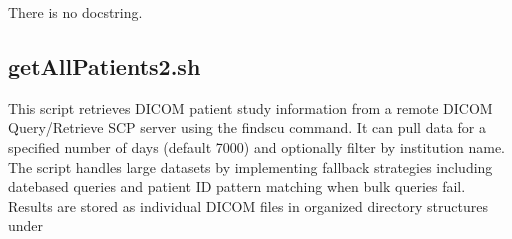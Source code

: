 \documentclass[letterpaper,10pt,english]{sphinxmanual}
\begin{document}
\sphinxAtStartPar
There is no docstring.

\sphinxstepscope


\subsection{getAllPatients2.sh}
\label{\detokenize{Architecture/scripts/getAllPatients2:getallpatients2-sh}}\label{\detokenize{Architecture/scripts/getAllPatients2::doc}}
\sphinxAtStartPar
This script retrieves DICOM patient study information from a remote DICOM Query/Retrieve SCP server using the findscu command. It can pull data for a specified number of days (default 7000) and optionally filter by institution name. The script handles large datasets by implementing fallback strategies including date\sphinxhyphen{}based queries and patient ID pattern matching when bulk queries fail. Results are stored as individual DICOM files in organized directory structures under 

\sphinxAtStartPar
{}


\sphinxAtStartPar
{}

\end{document}
